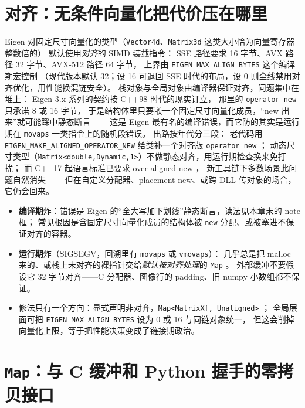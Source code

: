 \documentclass[12pt,a4paper,fontset=fandol]{ctexbook}
\newcommand{\Tp}[1]{\texttt{#1}}
\newcommand{\Bk}{\allowbreak}
\newcommand{\Lang}[1]{\textsf{\bfseries #1}}
\newcommand{\PY}{\Lang{Python}}
\begin{document}
\section{对齐：无条件向量化把代价压在哪里}

Eigen 对固定尺寸向量化的类型（\Tp{Vector4d}、\Tp{Matrix3d} 这类大小恰为向量寄存器整数倍的）
默认使用\emph{对齐}的 SIMD 装载指令：
SSE 路径要求 16 字节、AVX 路径 32 字节、AVX-512 路径 64 字节，
上界由 \Tp{EIGEN\_MAX\_ALIGN\_BYTES} \Bk{} 这个编译期宏控制
（现代版本默认 32；设 16 可退回 SSE 时代的布局，设 0 则全线禁用对齐优化，用性能换混链安全）。
栈对象与全局对象由编译器保证对齐，问题集中在堆上：
Eigen 3.x 系列的契约按 C++98 时代的现实订立，
那里的 \Tp{operator new} \Bk{} 只承诺 8 或 16 字节，
于是结构体里只要嵌一个固定尺寸向量化成员，``new 出来''就可能踩中静态断言——
这是 Eigen 最有名的编译错误，而它防的其实是运行期在 \Tp{movaps} \Bk{} 一类指令上的随机段错误。
出路按年代分三段：
老代码用 \Tp{EIGEN\_MAKE\_ALIGNED\_OPERATOR\_NEW} \Bk{} 给类补一个对齐版 \Tp{operator new} \Bk{}；
动态尺寸类型（\Tp{Matrix<double,Dynamic,1>}）不做静态对齐，用运行期检查换来免打扰；
而 C++17 起语言标准已要求 over-aligned new \Bk{}，
新工具链下多数场景此问题自然消失——
但在自定义分配器、placement new、或跨 DLL 传对象的场合，它仍会回来。

\begin{warning}[title={对齐崩溃的两种炸法与统一修法}]
\begin{itemize}
\item \textbf{编译期}炸：错误是 Eigen 的``全大写加下划线''静态断言，读法见本章末的 note 框；
  常见根因是含固定尺寸向量化成员的结构体被 \Tp{new} \Bk{} 分配、或被塞进不保证对齐的容器。
\item \textbf{运行期}炸（SIGSEGV，回溯里有 \Tp{movaps} 或 \Tp{vmovaps}）：
  几乎总是把 malloc 来的、或栈上未对齐的裸指针交给\emph{默认按对齐处理}的 \Tp{Map} \Bk{}。
  外部缓冲不要假设它 32 字节对齐——C 分配器、图像行的 padding、旧 numpy 小数组都不保证。
\item 修法只有一个方向：显式声明非对齐，\Tp{Map<MatrixXf, Unaligned>} \Bk{}；
  全局层面可把 \Tp{EIGEN\_MAX\_ALIGN\_BYTES} \Bk{} 设为 0 或 16 与同链对象统一，
  但这会削掉向量化上限，等于把性能决策变成了链接期政治。
\end{itemize}
\end{warning}

\section{\Tp{Map}：与 C 缓冲和 \PY{} 握手的零拷贝接口}
\end{document}
